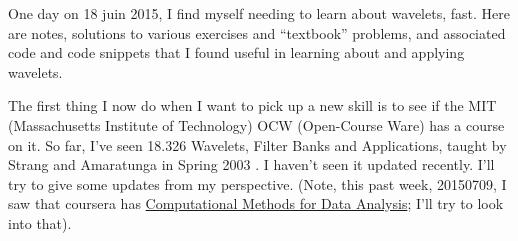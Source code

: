 \documentclass[twoside]{amsart}
\theoremstyle{plain}
\theoremstyle{definition}
\theoremstyle{remark}
\numberwithin{equation}{section}
\begin{document}
\maketitle

One day on 18 juin 2015, I find myself needing to learn about wavelets, fast.  Here are notes, solutions to various exercises and ``textbook'' problems, and associated code and code snippets that I found useful in learning about and applying wavelets.  

The first thing I now do when I want to pick up a new skill is to see if the MIT (Massachusetts Institute of Technology) OCW (Open-Course Ware) has a course on it.  So far, I've seen 18.326 Wavelets, Filter Banks and Applications, taught by Strang and Amaratunga in Spring 2003 \cite{GStrangKAmaratunga2003}.  I haven't seen it updated recently.  I'll try to give some updates from my perspective. (Note, this past week, 20150709, I saw that coursera has \href{https://www.coursera.org/course/compmethods}{Computational Methods for Data Analysis}; I'll try to look into that).  
\end{document}
